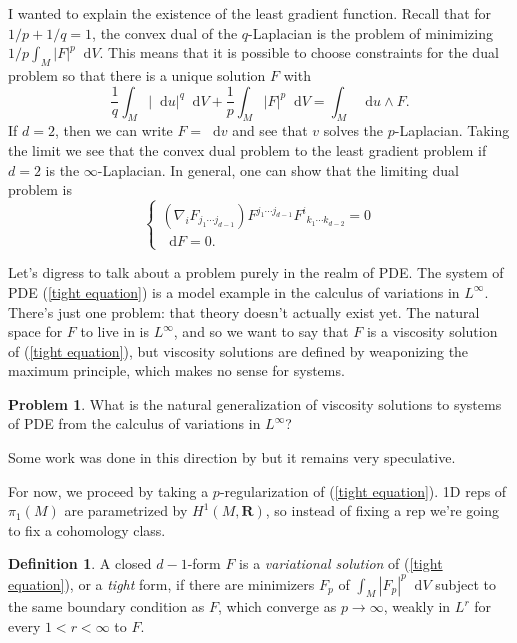 \documentclass[reqno,11pt]{amsart}
\newcommand{\RR}{\mathbf{R}}
\newcommand*\dif{\mathop{}\!\mathrm{d}}
\newcommand{\dfn}[1]{\emph{#1}\index{#1}}
\theoremstyle{definition}
\newtheorem{definition}[theorem]{Definition}
\newtheorem{problem}[theorem]{Problem}
\numberwithin{equation}{section}
\begin{document}
I wanted to explain the existence of the least gradient function.
Recall that for $1/p + 1/q = 1$, the convex dual of the $q$-Laplacian is the problem of minimizing $1/p \int_M |F|^p \dif V$.
This means that it is possible to choose constraints for the dual problem so that there is a unique solution $F$ with 
$$\frac{1}{q} \int_M |\dif u|^q \dif V + \frac{1}{p} \int_M |F|^p \dif V = \int_M \dif u \wedge F.$$
If $d = 2$, then we can write $F = \dif v$ and see that $v$ solves the $p$-Laplacian.
Taking the limit we see that the convex dual problem to the least gradient problem if $d = 2$ is the $\infty$-Laplacian.
In general, one can show that the limiting dual problem is 
\begin{equation}\label{tight equation}
\begin{cases}
    (\nabla_i F_{j_1 \cdots j_{d - 1}}) F^{j_1 \cdots j_{d - 1}} {F^i}_{k_1 \cdots k_{d - 2}} = 0 \\
    \dif F = 0.
\end{cases}
\end{equation}

Let's digress to talk about a problem purely in the realm of PDE.
The system of PDE (\ref{tight equation}) is a model example in the calculus of variations in $L^\infty$.
There's just one problem: that theory doesn't actually exist yet. 
The natural space for $F$ to live in is $L^\infty$, and so we want to say that $F$ is a viscosity solution of (\ref{tight equation}), but viscosity solutions are defined by weaponizing the maximum principle, which makes no sense for systems.

\begin{problem}
What is the natural generalization of viscosity solutions to systems of PDE from the calculus of variations in $L^\infty$?
\end{problem}

Some work was done in this direction by \cite{Katzourakis2018OnAV} but it remains very speculative.

For now, we proceed by taking a $p$-regularization of (\ref{tight equation}).
1D reps of $\pi_1(M)$ are parametrized by $H^1(M, \RR)$, so instead of fixing a rep we're going to fix a cohomology class.

\begin{definition}
A closed $d - 1$-form $F$ is a \dfn{variational solution} of (\ref{tight equation}), or a \dfn{tight} form, if there are minimizers $F_p$ of $\int_M |F_p|^p \dif V$ subject to the same boundary condition as $F$, which converge as $p \to \infty$, weakly in $L^r$ for every $1 < r < \infty$ to $F$.
\end{definition}
\end{document}
